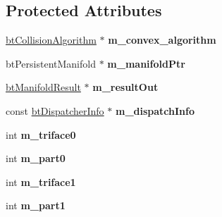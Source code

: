 \subsection*{Protected Attributes}
\begin{DoxyCompactItemize}
\item 
\mbox{\label{classbtGImpactCollisionAlgorithm_ae80151ce7c10de7d6a091acab9ee1c63}} 
\hyperlink{classbtCollisionAlgorithm}{bt\+Collision\+Algorithm} $\ast$ {\bfseries m\+\_\+convex\+\_\+algorithm}
\item 
\mbox{\label{classbtGImpactCollisionAlgorithm_abb5154e9ccaee0ef50b28d464f491a2a}} 
bt\+Persistent\+Manifold $\ast$ {\bfseries m\+\_\+manifold\+Ptr}
\item 
\mbox{\label{classbtGImpactCollisionAlgorithm_a47898ca4428d2c72e23f9cb7081ad927}} 
\hyperlink{classbtManifoldResult}{bt\+Manifold\+Result} $\ast$ {\bfseries m\+\_\+result\+Out}
\item 
\mbox{\label{classbtGImpactCollisionAlgorithm_ab88664893eb1dafc9a792a88811ab466}} 
const \hyperlink{structbtDispatcherInfo}{bt\+Dispatcher\+Info} $\ast$ {\bfseries m\+\_\+dispatch\+Info}
\item 
\mbox{\label{classbtGImpactCollisionAlgorithm_aecfe1ce2023c372295c2b93941b050d8}} 
int {\bfseries m\+\_\+triface0}
\item 
\mbox{\label{classbtGImpactCollisionAlgorithm_a41e0e286a07df8172b640489a128254c}} 
int {\bfseries m\+\_\+part0}
\item 
\mbox{\label{classbtGImpactCollisionAlgorithm_a6bdf9734111e50142e1ebe1870922dbc}} 
int {\bfseries m\+\_\+triface1}
\item 
\mbox{\label{classbtGImpactCollisionAlgorithm_a71445213f3c35026b43d7dd8db1de71d}} 
int {\bfseries m\+\_\+part1}
\end{DoxyCompactItemize}
